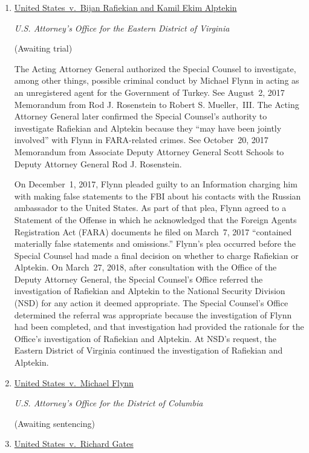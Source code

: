 \begin{enumerate}[1.]

\item \underline{United States~v.\ Bijan Rafiekian and Kamil Ekim Alptekin}

\textit{U.S. Attorney's Office for the Eastern District of Virginia}

(Awaiting trial)

The Acting Attorney General authorized the Special Counsel to investigate, among other things, possible criminal conduct by Michael Flynn in acting as an unregistered agent for the Government of Turkey.
See August~2, 2017 Memorandum from Rod J. Rosenstein to Robert S. Mueller,~III\null.
The Acting Attorney General later confirmed the Special Counsel's authority to investigate Rafiekian and Alptekin because they ``may have been jointly involved'' with Flynn in FARA-related crimes.
See October~20, 2017 Memorandum from Associate Deputy Attorney General Scott Schools to Deputy Attorney General Rod J. Rosenstein.

On December~1, 2017, Flynn pleaded guilty to an Information charging him with making false statements to the FBI about his contacts with the Russian ambassador to the United States.
As part of that plea, Flynn agreed to a Statement of the Offense in which he acknowledged that the Foreign Agents Registration Act (FARA) documents he filed on March~7, 2017 ``contained materially false statements and omissions.''
Flynn's plea occurred before the Special Counsel had made a final decision on whether to charge Rafiekian or Alptekin.
On March~27, 2018, after consultation with the Office of the Deputy Attorney General, the Special Counsel's Office referred the investigation of Rafiekian and Alptekin to the National Security Division (NSD) for any action it deemed appropriate.
The Special Counsel's Office determined the referral was appropriate because the investigation of Flynn had been completed, and that investigation had provided the rationale for the Office's investigation of Rafiekian and Alptekin.
At NSD's request, the Eastern District of Virginia continued the investigation of Rafiekian and Alptekin.

    \item \underline{United States~v.\ Michael Flynn}

\textit{U.S. Attorney's Office for the District of Columbia}

(Awaiting sentencing)

    \item \underline{United States~v.\ Richard Gates}


\end{enumerate}
